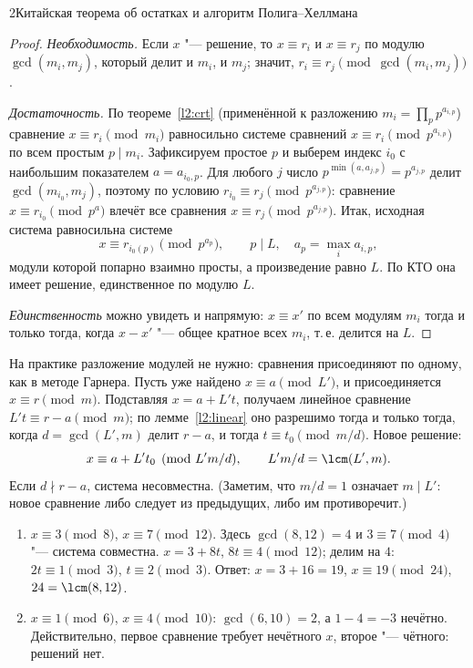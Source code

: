 \begin{lecture}{2}{Китайская теорема об остатках и алгоритм Полига–Хеллмана}
\begin{proof}
\emph{Необходимость.} Если $x$ "--- решение, то $x \equiv r_i$ и $x \equiv r_j$ по модулю
$\gcd(m_i, m_j)$, который делит и $m_i$, и $m_j$; значит, $r_i \equiv r_j \pmod{\gcd(m_i, m_j)}$.

\emph{Достаточность.} По теореме~\ref{l2:crt} (применённой к разложению $m_i = \prod_p p^{a_{i,p}}$)
сравнение $x \equiv r_i \pmod{m_i}$ равносильно системе сравнений
$x \equiv r_i \pmod{p^{a_{i,p}}}$ по всем простым $p \mid m_i$. Зафиксируем простое $p$ и выберем
индекс $i_0$ с наибольшим показателем $a = a_{i_0, p}$. Для любого $j$ число
$p^{\min(a, a_{j,p})} = p^{a_{j,p}}$ делит $\gcd(m_{i_0}, m_j)$, поэтому по условию
$r_{i_0} \equiv r_j \pmod{p^{a_{j,p}}}$: сравнение $x \equiv r_{i_0} \pmod{p^{a}}$ влечёт все
сравнения $x \equiv r_j \pmod{p^{a_{j,p}}}$. Итак, исходная система равносильна системе
\[
  x \equiv r_{i_0(p)} \pmod{p^{a_p}}, \qquad p \mid L, \quad a_p = \max_i a_{i,p},
\]
модули которой попарно взаимно просты, а произведение равно $L$. По КТО она имеет решение,
единственное по модулю $L$.

\emph{Единственность} можно увидеть и напрямую: $x \equiv x'$ по всем модулям $m_i$ тогда и только
тогда, когда $x - x'$ "--- общее кратное всех $m_i$, т.\,е. делится на $L$.
\end{proof}

На практике разложение модулей не нужно: сравнения присоединяют по одному, как в методе Гарнера.
Пусть уже найдено $x \equiv a \pmod{L'}$, и присоединяется $x \equiv r \pmod m$. Подставляя
$x = a + L' t$, получаем линейное сравнение $L' t \equiv r - a \pmod m$; по
лемме~\ref{l2:linear} оно разрешимо тогда и только тогда, когда $d = \gcd(L', m)$ делит $r - a$, и
тогда $t \equiv t_0 \pmod{m/d}$. Новое решение:
\[
  x \equiv a + L' t_0 \pmod{L' m / d}, \qquad L' m / d = \lcm(L', m).
\]
Если $d \nmid r - a$, система несовместна. (Заметим, что $m/d = 1$ означает $m \mid L'$: новое
сравнение либо следует из предыдущих, либо им противоречит.)

\begin{example}\label{l2:noncoprime}
\begin{enumerate}
  \item $x \equiv 3 \pmod 8$, $x \equiv 7 \pmod{12}$. Здесь $\gcd(8, 12) = 4$ и $3 \equiv 7 \pmod 4$
    "--- система совместна. $x = 3 + 8t$, $8t \equiv 4 \pmod{12}$; делим на $4$: $2t \equiv 1 \pmod 3$,
    $t \equiv 2 \pmod 3$. Ответ: $x = 3 + 16 = 19$, $x \equiv 19 \pmod{24}$, $24 = \lcm(8, 12)$.
  \item $x \equiv 1 \pmod 6$, $x \equiv 4 \pmod{10}$: $\gcd(6, 10) = 2$, а $1 - 4 = -3$ нечётно.
    Действительно, первое сравнение требует нечётного $x$, второе "--- чётного: решений нет.
\end{enumerate}
\end{example}


\end{lecture}
